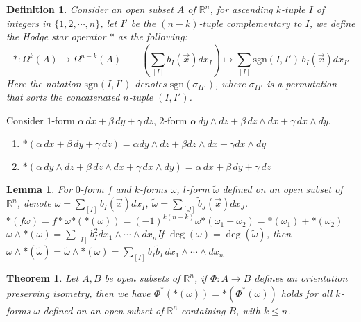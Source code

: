 \documentclass[9pt]{article}
\theoremstyle{break}
\theoremstyle{break}
\newtheorem{thm}{Theorem}[section]
\newtheorem{lem}{Lemma}[thm]
\newtheorem{defn}{Definition}[corL]
\newcommand{\R}{\mathbb{R}}
\newcommand{\sgn}{\text{sgn}}
\newcommand{\that}[1]{\widetilde{#1}}
\begin{document}
\begin{defn}
Consider an open subset $A$ of $\R^n$, for ascending $k$-tuple $I$ of integers in $\{1,2,\cdots, n\}$, let $I'$ be the $(n-k)$-tuple complementary to $I$, we define the Hodge star operator $*$ as the following: 
$$ *: \Omega^k(A) \to \Omega^{n-k}(A) \qquad\left(\sum_{[I]}b_I(\vec{x}) dx_I\right) \mapsto \sum_{[I]}\text{sgn}(I,I')\, b_I(\vec{x}) dx_{I'}$$
Here the notation $\text{sgn}(I,I')$ denotes $\sgn(\sigma_{II'})$, where $\sigma_{II'}$ is a permutation that sorts the concatenated $n$-tuple $(I,I')$.
\end{defn}


Consider $1$-form $\alpha \, dx + \beta \, dy + \gamma \, dz$, $2$-form $\alpha\, dy \wedge dz + \beta\, dz \wedge dx + \gamma\, dx \wedge dy$.
\begin{enumerate}[topsep=3pt,itemsep=-1ex,partopsep=1ex,parsep=1ex]
\item $*(\alpha \, dx + \beta \, dy + \gamma \, dz) = \alpha dy \wedge dz + \beta dz \wedge dx + \gamma dx \wedge dy$
\item $*(\alpha\, dy \wedge dz + \beta\, dz \wedge dx + \gamma\, dx \wedge dy) = \alpha\, dx + \beta \, dy + \gamma \, dz$
\end{enumerate}



\begin{lem}
For $0$-form $f$ and $k$-forms $\omega$, $l$-form $\that{\omega}$ defined on an open subset of $\R^n$, denote $\omega = \sum_{[I]} b_I(\vec{x}) dx_I ,\ \that{\omega} =\sum_{[J]} \that{b}_J(\vec{x}) dx_J$.\\
$*(f\omega) = f*\omega$\qquad \qquad $*(*(\omega)) = (-1)^{k(n-k)}\omega$\qquad \qquad $*(\omega_1 + \omega_2) = *(\omega_1) + *(\omega_2)$\\
$\omega\wedge *(\omega) = \sum_{[I]}b_I^2 dx_1 \wedge \cdots\wedge dx_n$\qquad\qquad If $\deg(\omega) = \deg(\that{\omega})$, then $\omega \wedge *(\that{\omega}) = \that{\omega}\wedge *(\omega) = \sum_{[I]} b_I \that{b}_I \, dx_1 \wedge \cdots \wedge dx_n$
\end{lem}



\begin{thm}
Let $A, B$ be open subsets of $\R^n$, if $\Phi:A \to B$ defines an orientation preserving isometry, then we have $\Phi^*(*(\omega)) = *(\Phi^*(\omega))$ holds for all $k$-forms $\omega$ defined on an open subset of $\R^n$ containing $B$, with $k\leq n$.
\end{thm}
\end{document}
